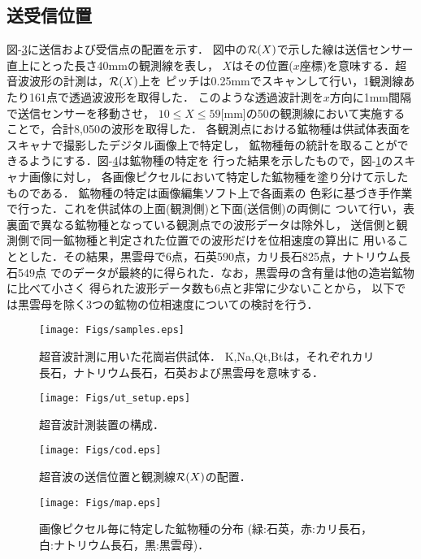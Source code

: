 \subsection{送受信位置}
図-\ref{fig:fig3}に送信および受信点の配置を示す．
図中の${\cal R}(X)$で示した線は送信センサー直上にとった長さ40mmの観測線を表し，
$X$はその位置($x$座標)を意味する．超音波波形の計測は，${\cal R}(X)$上を
ピッチは0.25mmでスキャンして行い，1観測線あたり161点で透過波波形を取得した．
このような透過波計測を$x$方向に1mm間隔で送信センサーを移動させ，
$10\leq X \leq 59$[mm]の50の観測線において実施することで，合計8,050の波形を取得した．
各観測点における鉱物種は供試体表面をスキャナで撮影したデジタル画像上で特定し，
鉱物種毎の統計を取ることができるようにする．図-\ref{fig:fig4}は鉱物種の特定を
行った結果を示したもので，図-\ref{fig:fig1}のスキャナ画像に対し，
各画像ピクセルにおいて特定した鉱物種を塗り分けて示したものである．
鉱物種の特定は画像編集ソフト上で各画素の
色彩に基づき手作業で行った．これを供試体の上面(観測側)と下面(送信側)の両側に
ついて行い，表裏面で異なる鉱物種となっている観測点での波形データは除外し，
送信側と観測側で同一鉱物種と判定された位置での波形だけを位相速度の算出に
用いることとした．その結果，黒雲母で6点，石英590点，カリ長石825点，ナトリウム長石549点
でのデータが最終的に得られた．なお，黒雲母の含有量は他の造岩鉱物に比べて小さく
得られた波形データ数も6点と非常に少ないことから，
以下では黒雲母を除く3つの鉱物の位相速度についての検討を行う．
\begin{figure}
\begin{center}
\texttt{[image: Figs/samples.eps]}
\caption{
	超音波計測に用いた花崗岩供試体．
	K,Na,Qt,Btは，それぞれカリ長石，ナトリウム長石，石英および黒雲母を意味する．
}
\label{fig:fig1}
\end{center}
	\vspace{-5mm}
\end{figure}
\begin{figure}[t]
\begin{center}
\texttt{[image: Figs/ut\_setup.eps]}
\caption{ 超音波計測装置の構成． }
\label{fig:fig2}
\end{center}
\end{figure}
\begin{figure}[t]
\begin{center}
\texttt{[image: Figs/cod.eps]}
\caption{
	超音波の送信位置と観測線${\cal R}(X)$の配置．
}
\label{fig:fig3}
\end{center}
\end{figure}
\begin{figure}[t]
\begin{center}
\texttt{[image: Figs/map.eps]}
\caption{
	画像ピクセル毎に特定した鉱物種の分布
	(緑:石英，赤:カリ長石，白:ナトリウム長石，黒:黒雲母)．
}
\label{fig:fig4}
\end{center}
\end{figure}

